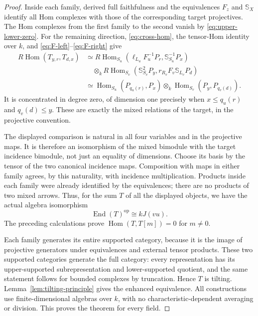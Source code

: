 \documentclass[11pt]{article}
\theoremstyle{definition}
\newcommand{\Hom}{\operatorname{Hom}}
\newcommand{\End}{\operatorname{End}}
\begin{document}
\begin{proof}
Inside each family, derived full faithfulness and the equivalences
$F_z$ and $\mathbb S_X$ identify all Hom complexes with those of the
corresponding target projectives. The Hom complexes from the first
family to the second vanish by \eqref{eq:upper-lower-zero}.
For the remaining direction, \eqref{eq:cross-hom}, the tensor-Hom
identity over $k$, and \eqref{eq:F-left}--\eqref{eq:F-right} give
\begin{align*}
 R\Hom(T_{y,r},T_{d,x})
 &\simeq R\Hom_{S_u}(\ell_{L_u}F_u^{-1}P_r,
                         \mathbb S_{S_u}^{-1}P_x)\\
 &\hspace{1em}\otimes_k
 R\Hom_{S_v}(\mathbb S_{S_v}^{2}P_y,
                         r_{R_v}F_v\mathbb S_{L_v}P_d)\\
 &\simeq \Hom_{S_u}(P_{q_u(r)},P_x)
                  \otimes_k\Hom_{S_v}(P_y,P_{q_v(d)}).
\end{align*}
It is concentrated in degree zero, of dimension one precisely when
$x\leq q_u(r)$ and $q_v(d)\leq y$. These are exactly the mixed
relations of the target, in the projective convention.

The displayed comparison is natural in all four variables and in
the projective maps. It is therefore an isomorphism of the mixed
bimodule with the target incidence bimodule, not just an equality
of dimensions. Choose its basis by the tensor of the two canonical
incidence maps. Composition with maps in either family agrees,
by this naturality, with incidence multiplication. Products inside
each family were already identified by the equivalences; there
are no products of two mixed arrows. Thus, for the sum $T$ of all
the displayed objects, we have the actual algebra isomorphism
\[
 \End(T)^{\mathrm{op}}\cong kJ(vu).
\]
The preceding calculations prove $\Hom(T,T[m])=0$ for $m\ne0$.

Each family generates its entire supported category, because it
is the image of projective generators under equivalences and
external tensor products. These two supported categories generate
the full category: every representation has its upper-supported
subrepresentation and lower-supported quotient, and the same
statement follows for bounded complexes by truncation. Hence $T$
is tilting. Lemma~\ref{lem:tilting-principle} gives the enhanced equivalence. All constructions use finite-dimensional
algebras over $k$, with no characteristic-dependent averaging or
division. This proves the theorem for every field.
\end{proof}
\end{document}
